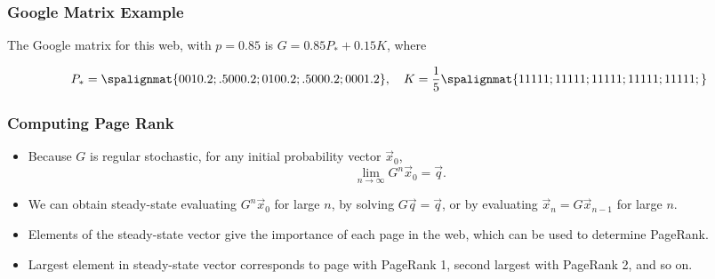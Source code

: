 \begin{frame}\frametitle{Google Matrix Example}


    \begin{center}
    \end{center}    
    
    The Google matrix for this web, with $p = 0.85$ is $G = 0.85P_* + 0.15K$, where
    
    \pause
    
    $$P_* = \spalignmat{0 0 1 0 .2;.5 0 0 0 .2;0 1 0 0 .2;.5 0 0 0 .2;0 0 0 1 .2}, \quad K = \frac 15 \spalignmat{1 1 1 1 1;1 1 1 1 1;1 1 1 1 1;1 1 1 1 1;1 1 1 1 1;}$$

\end{frame}



\begin{frame}

\frametitle{Computing Page Rank}

\begin{itemize}
	\item Because $G$ is regular stochastic, for any initial probability vector $\vec x_0$, $$\lim_{n \rightarrow \infty} G^n \vec x_0 = \vec q.$$ \pause

	\item We can obtain steady-state evaluating $G^n\vec x_0$ for large $n$, by solving $G\vec q = \vec q$, or by evaluating $\vec x_n = G \vec x_{n-1}$ for large $n$.\pause
	\item Elements of the steady-state vector give the importance of each page in the web, which can be used to determine PageRank. \pause
	\item Largest element in steady-state vector corresponds to page with PageRank 1, second largest with PageRank 2, and so on.

\end{itemize}


\end{frame}

